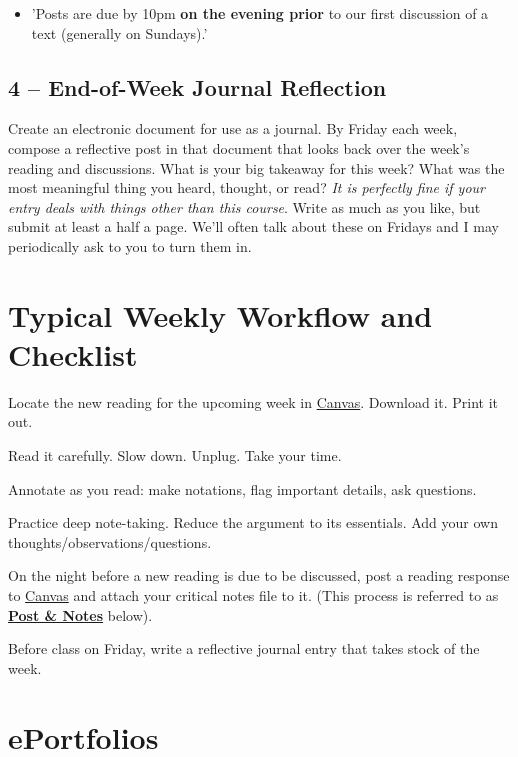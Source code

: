 \documentclass[letterpaper]{article}
\def\mylib#1{'#1'}%
\begin{document}
\begin{itemize}
\item \mylib{Posts are due by 10pm \textbf{on the evening prior} to our first discussion of a text (generally on Sundays).}

\end{itemize}


\subsection*{4 -- End-of-Week Journal Reflection}

Create an electronic document for use as a journal. By Friday each week, compose a reflective post in that document that looks back over the week's reading and discussions. What is your big takeaway for this week? What was the most meaningful thing you heard, thought, or read? \emph{It is perfectly fine if your entry deals with things other than this course}. Write as much as you like, but submit at least a half a page. We'll often talk about these on Fridays and I may periodically ask to you to turn them in.

\section*{Typical Weekly Workflow and Checklist}

\begin{todolist}

\item Locate the new reading for the upcoming week in \href{https://canvas.dartmouth.edu}{Canvas}. Download it. Print it out.
\item Read it carefully. Slow down. Unplug. Take your time.
\item Annotate as you read: make notations, flag important details, ask questions.
\item Practice deep note-taking. Reduce the argument to its essentials. Add your own thoughts/observations/questions.
\item On the night before a new reading is due to be discussed, post a reading response to \href{https://canvas.dartmouth.edu}{Canvas} and attach your critical notes file to it. (This process is referred to as \href{https://canvas.dartmouth.edu/}{\textbf{Post \& Notes}} below).
\item Before class on Friday, write a reflective journal entry that takes stock of the week.

\end{todolist}

\section*{{\portfolio e}Portfolios}
\end{document}
